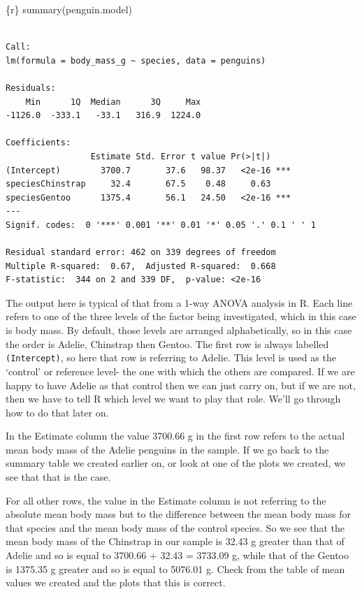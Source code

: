 \documentclass[
  letterpaper,
  DIV=11,
  numbers=noendperiod]{scrreprt}
\newenvironment{Shaded}{\begin{snugshade}}{\end{snugshade}}
\newcommand{\InformationTok}[1]{\textcolor[rgb]{0.37,0.37,0.37}{#1}}
\begin{document}
\begin{Shaded}
\begin{Highlighting}[]
\InformationTok{\textasciigrave{}\textasciigrave{}\textasciigrave{}\{r\}}
\InformationTok{summary(penguin.model)}
\InformationTok{\textasciigrave{}\textasciigrave{}\textasciigrave{}}
\end{Highlighting}
\end{Shaded}

\begin{verbatim}

Call:
lm(formula = body_mass_g ~ species, data = penguins)

Residuals:
    Min      1Q  Median      3Q     Max 
-1126.0  -333.1   -33.1   316.9  1224.0 

Coefficients:
                 Estimate Std. Error t value Pr(>|t|)    
(Intercept)        3700.7       37.6   98.37   <2e-16 ***
speciesChinstrap     32.4       67.5    0.48     0.63    
speciesGentoo      1375.4       56.1   24.50   <2e-16 ***
---
Signif. codes:  0 '***' 0.001 '**' 0.01 '*' 0.05 '.' 0.1 ' ' 1

Residual standard error: 462 on 339 degrees of freedom
Multiple R-squared:  0.67,  Adjusted R-squared:  0.668 
F-statistic:  344 on 2 and 339 DF,  p-value: <2e-16
\end{verbatim}

The output here is typical of that from a 1-way ANOVA analysis in R.
Each line refers to one of the three levels of the factor being
investigated, which in this case is body mass. By default, those levels
are arranged alphabetically, so in this case the order is Adelie,
Chinstrap then Gentoo. The first row is always labelled
\texttt{(Intercept)}, so here that row is referring to Adelie. This
level is used as the `control' or reference level- the one with which
the others are compared. If we are happy to have Adelie as that control
then we can just carry on, but if we are not, then we have to tell R
which level we want to play that role. We'll go through how to do that
later on.

In the Estimate column the value 3700.66 g in the first row refers to
the actual mean body mass of the Adelie penguins in the sample. If we go
back to the summary table we created earlier on, or look at one of the
plots we created, we see that that is the case.

For all other rows, the value in the Estimate column is not referring to
the absolute mean body mass but to the difference between the mean body
mass for that species and the mean body mass of the control species. So
we see that the mean body mass of the Chinstrap in our sample is 32.43 g
greater than that of Adelie and so is equal to 3700.66 + 32.43 = 3733.09
g, while that of the Gentoo is 1375.35 g greater and so is equal to
5076.01 g. Check from the table of mean values we created and the plots
that this is correct.
\end{document}
